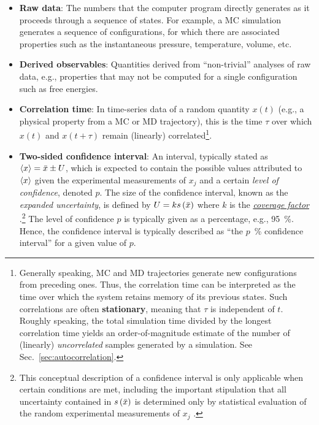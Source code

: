 \begin{itemize}
\item {\bf Raw data}: The numbers that the computer program directly generates as it proceeds through a sequence of states.
For example, a MC simulation generates a sequence of configurations, for which there are associated properties such as the instantaneous pressure, temperature, volume, etc.
\label{def:raw_data}
\item {\bf Derived observables}: Quantities derived from ``non-trivial'' analyses of raw data, e.g., properties that may not be computed for a single configuration such as free energies.
  \label{def:deriv_obs}
 

\item {\bf Correlation time}: In time-series data of a random quantity $x(t)$ (e.g., a physical property from a MC or MD trajectory), this is the time $\tau$ over which $x(t)$ and $x(t+\tau)$ remain (linearly) correlated\footnote{Generally speaking, MC and MD trajectories generate new configurations from preceding ones.
Thus, the correlation time can be interpreted as the time over which the system retains memory of its previous states.
Such correlations are often {\bf stationary}, meaning that $\tau$ is independent of $t$.
Roughly speaking, the total simulation time divided by the longest correlation time yields an order-of-magnitude estimate of the number of (linearly) {\it uncorrelated} samples generated by a simulation. See Sec.~\ref{sec:autocorrelation}.}.
\label{def:corr_time}

\item {\bf Two-sided confidence interval}: An interval, typically stated as $\langle x \rangle = \bar{x} \pm U$, which is expected to contain the possible values attributed to $\langle x \rangle$ given the experimental measurements of $x_j$ and a certain {\it level of confidence}, denoted $p$.
  The size of the confidence interval, known as the {\it expanded uncertainty}, is defined by $U = k s\left( \bar{x} \right)$ where $k$ is the \hyperref[def:coveragefactor]{\it coverage factor} \cite{JCGM:VIM2012}.\footnote{This conceptual description of a confidence interval is only applicable when certain conditions are met, including the important stipulation that all uncertainty contained in $s\left( \bar{x} \right)$ is determined only by statistical evaluation of the random experimental measurements of $x_j$ \cite{JCGM:GUM2008}.}
  The level of confidence $p$ is typically given as a percentage, e.g., 95~\%. Hence, the confidence interval is typically described as ``the $p$~\% confidence interval'' for a given value of $p$.
  \label{def:conf_int}


\end{itemize}
